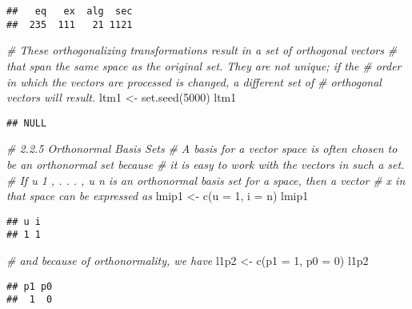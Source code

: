 \documentclass[
]{article}
\newenvironment{Shaded}{\begin{snugshade}}{\end{snugshade}}
\newcommand{\AttributeTok}[1]{\textcolor[rgb]{0.77,0.63,0.00}{#1}}
\newcommand{\CommentTok}[1]{\textcolor[rgb]{0.56,0.35,0.01}{\textit{#1}}}
\newcommand{\DecValTok}[1]{\textcolor[rgb]{0.00,0.00,0.81}{#1}}
\newcommand{\FunctionTok}[1]{\textcolor[rgb]{0.00,0.00,0.00}{#1}}
\newcommand{\NormalTok}[1]{#1}
\newcommand{\OtherTok}[1]{\textcolor[rgb]{0.56,0.35,0.01}{#1}}
\begin{document}
\begin{verbatim}
##   eq   ex  alg  sec 
##  235  111   21 1121
\end{verbatim}

\begin{Shaded}
\begin{Highlighting}[]
\CommentTok{\# These orthogonalizing transformations result in a set of orthogonal vectors}
\CommentTok{\# that span the same space as the original set. They are not unique; if the }
\CommentTok{\# order in which the vectors are processed is changed, a different set of }
\CommentTok{\# orthogonal vectors will result.}
\NormalTok{ltm1 }\OtherTok{\textless{}{-}} \FunctionTok{set.seed}\NormalTok{(}\DecValTok{5000}\NormalTok{)}
\NormalTok{ltm1}
\end{Highlighting}
\end{Shaded}

\begin{verbatim}
## NULL
\end{verbatim}

\begin{Shaded}
\begin{Highlighting}[]
\CommentTok{\# 2.2.5 Orthonormal Basis Sets}
\CommentTok{\# A basis for a vector space is often chosen to be an orthonormal set because }
\CommentTok{\# it is easy to work with the vectors in such a set.}
\CommentTok{\# If u 1 , . . . , u n is an orthonormal basis set for a space, then a vector }
\CommentTok{\# x in that space can be expressed as}
\NormalTok{lmip1 }\OtherTok{\textless{}{-}} \FunctionTok{c}\NormalTok{(}\AttributeTok{u =} \DecValTok{1}\NormalTok{, }\AttributeTok{i =}\NormalTok{ n)}
\NormalTok{lmip1}
\end{Highlighting}
\end{Shaded}

\begin{verbatim}
## u i 
## 1 1
\end{verbatim}

\begin{Shaded}
\begin{Highlighting}[]
\CommentTok{\# and because of orthonormality, we have}
\NormalTok{l1p2 }\OtherTok{\textless{}{-}} \FunctionTok{c}\NormalTok{(}\AttributeTok{p1 =} \DecValTok{1}\NormalTok{, }\AttributeTok{p0 =} \DecValTok{0}\NormalTok{)}
\NormalTok{l1p2}
\end{Highlighting}
\end{Shaded}

\begin{verbatim}
## p1 p0 
##  1  0
\end{verbatim}
\end{document}
